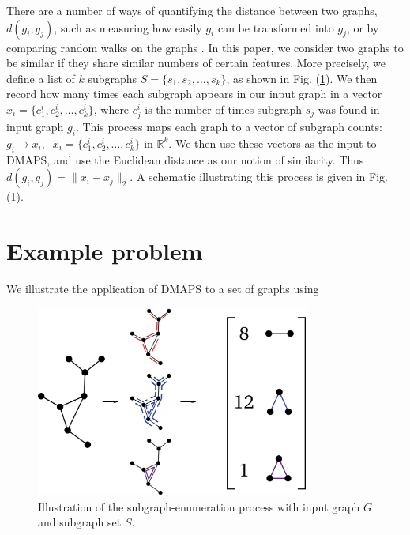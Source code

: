 \documentclass[11pt]{article}
\begin{document}
There are a number of ways of quantifying the distance between two graphs, $d(g_i, g_j)$, such as measuring how easily $g_i$ can be transformed into $g_j$, or by comparing random walks on the graphs \cite{edit_dist} \cite{graph_kernels}. In this paper, we consider two graphs to be similar if they share similar numbers of certain features. More precisely, we define a list of $k$ subgraphs $S=\{s_1, s_2, \ldots, s_k\}$, as shown in Fig. (\ref{fig:subgraph_counting}). We then record how many times each subgraph appears in our input graph in a vector $x_i = \{c_1^i, c_2^i, \ldots, c_k^i\}$, where $c_j^i$ is the number of times subgraph $s_j$ was found in input graph $g_i$. This process maps each graph to a vector of subgraph counts: $g_i \rightarrow x_i, \; \; x_i = \{c_1^i, c_2^i, \ldots, c_k^i\}$ in $\mathbb{R}^k$. We then use these vectors as the input to DMAPS, and use the Euclidean distance as our notion of similarity. Thus $d(g_i, g_j) = \| x_i - x_j \|_2$. A schematic illustrating this process is given in Fig. (\ref{fig:subgraph_counting}).

\section{Example problem}

We illustrate the application of DMAPS to a set of graphs using 

\begin{figure}[!h]
  \begin{center}
    \includegraphics[width=0.8\textwidth]{subgraph_counting_v2}
    \caption{Illustration of the subgraph-enumeration process with input graph $G$ and subgraph set $S$.}
  \end{center}
  \label{fig:subgraph_counting}
\end{figure}
\end{document}
